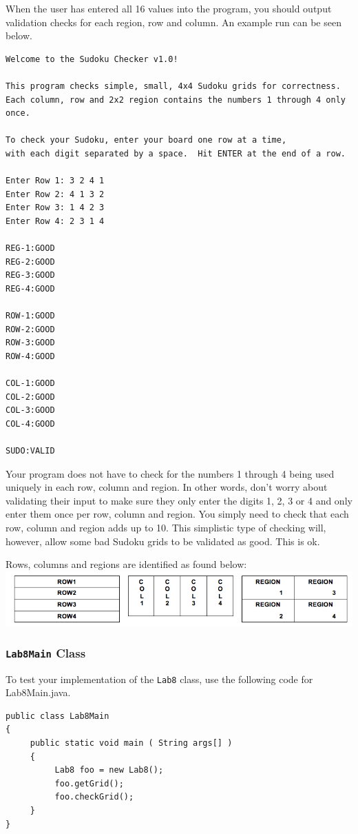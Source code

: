 \noindent When the user has entered all 16 values into the program, you should output validation checks for each region, row and column.  An example run can be seen below.
\begin{verbatim}
Welcome to the Sudoku Checker v1.0!

This program checks simple, small, 4x4 Sudoku grids for correctness. 
Each column, row and 2x2 region contains the numbers 1 through 4 only once.

To check your Sudoku, enter your board one row at a time, 
with each digit separated by a space.  Hit ENTER at the end of a row.

Enter Row 1: 3 2 4 1
Enter Row 2: 4 1 3 2
Enter Row 3: 1 4 2 3
Enter Row 4: 2 3 1 4

REG-1:GOOD
REG-2:GOOD
REG-3:GOOD
REG-4:GOOD

ROW-1:GOOD
ROW-2:GOOD
ROW-3:GOOD
ROW-4:GOOD

COL-1:GOOD
COL-2:GOOD
COL-3:GOOD
COL-4:GOOD

SUDO:VALID
\end{verbatim}

\noindent Your program does not have to check for the numbers 1 through 4 being used uniquely in each row, column and region.  In other words, don't worry about validating their input to make sure they only enter the digits 1, 2, 3 or 4 and only enter them once per row, column and region.  
You simply need to check that each row, column and region adds up to 10. This simplistic type of checking will, however, allow some bad Sudoku grids to be validated as good. This is ok. 

\noindent Rows, columns and regions are identified as found below:\\
\includegraphics[scale=0.5]{sud}

\subsubsection*{{\tt Lab8Main} Class}

To test your implementation of the {\tt Lab8} class, use the following code for Lab8Main.java.
\begin{verbatim}
public class Lab8Main
{
     public static void main ( String args[] )
     {
          Lab8 foo = new Lab8();
          foo.getGrid();
          foo.checkGrid();
     }
}
\end{verbatim}

